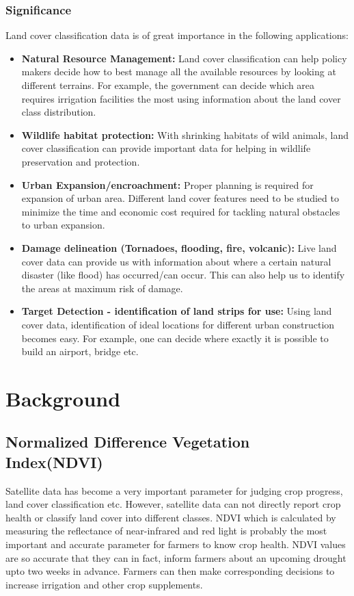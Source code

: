 \documentclass[12pt, a4paper]{report}
\begin{document}
\subsection{Significance}
Land cover classification data is of great importance in the following applications:
\begin{itemize}
\item \textbf{Natural Resource Management:} Land cover classification can help policy makers decide how to best manage all the available resources by looking at different terrains. For example, the government can decide which area requires irrigation facilities the most using information about the land cover class distribution. 
\item \textbf{Wildlife habitat protection:} With shrinking habitats of wild animals, land cover classification can provide important data for helping in wildlife preservation and protection.
 \item \textbf{Urban Expansion/encroachment:} Proper planning is required for expansion of urban area. Different land cover features need to be studied to minimize the time and economic cost required for tackling natural obstacles to urban expansion.
 \item \textbf{Damage delineation (Tornadoes, flooding, fire, volcanic):} Live land cover data can provide us with information about where a certain natural disaster (like flood) has occurred/can occur. This can also help us to identify the areas at maximum risk of damage.
 \item \textbf{Target Detection - identification of land strips for use:} Using land cover data, identification of ideal locations for different urban construction becomes easy. For example, one can decide where exactly it is possible to build an airport, bridge etc.
\end{itemize}

\newpage


\chapter{Background}

\section{Normalized Difference Vegetation Index(NDVI)}
Satellite data has become a  very important parameter for judging crop progress, land cover classification etc. However, satellite data can not directly report crop health or classify land cover into different classes. NDVI which is calculated by measuring the reflectance of near-infrared and red light is probably the most important and accurate parameter for farmers to know crop health. NDVI values are so accurate that they can in fact, inform farmers about an upcoming drought upto two weeks in advance. Farmers can then make corresponding decisions to increase irrigation and other crop supplements.
\end{document}
